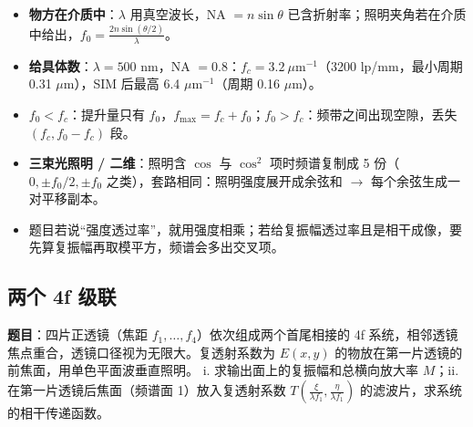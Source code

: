 \begin{warn}[变式]
\begin{itemize}
\item \textbf{物方在介质中}：$\lambda$ 用真空波长，NA $=n\sin\theta$ 已含折射率；照明夹角若在介质中给出，$f_0=\frac{2n\sin(\theta/2)}{\lambda}$。
\item \textbf{给具体数}：$\lambda=500$ nm，NA $=0.8$：$f_c=3.2\ \mu\text{m}^{-1}$（3200 lp/mm，最小周期 0.31 $\mu$m），SIM 后最高 6.4 $\mu$m$^{-1}$（周期 0.16 $\mu$m）。
\item \textbf{$f_0<f_c$}：提升量只有 $f_0$，$f_{\max}=f_c+f_0$；\textbf{$f_0>f_c$}：频带之间出现空隙，丢失 $(f_c,f_0-f_c)$ 段。
\item \textbf{三束光照明 / 二维}：照明含 $\cos$ 与 $\cos^2$ 项时频谱复制成 5 份（$0,\pm f_0/2,\pm f_0$ 之类），套路相同：照明强度展开成余弦和 $\to$ 每个余弦生成一对平移副本。
\item 题目若说“强度透过率”，就用强度相乘；若给复振幅透过率且是相干成像，要先算复振幅再取模平方，频谱会多出交叉项。
\end{itemize}
\end{warn}

\subsection{两个 4f 级联}\label{ex:v-4f2}
\noindent\textbf{题目}：四片正透镜（焦距 $f_1,\dots,f_4$）依次组成两个首尾相接的 4f 系统，相邻透镜焦点重合，透镜口径视为无限大。复透射系数为 $E(x,y)$ 的物放在第一片透镜的前焦面，用单色平面波垂直照明。
i. 求输出面上的复振幅和总横向放大率 $M$；ii. 在第一片透镜后焦面（频谱面 1）放入复透射系数 $T\!\left(\frac{\xi}{\lambda f_1},\frac{\eta}{\lambda f_1}\right)$ 的滤波片，求系统的相干传递函数。

